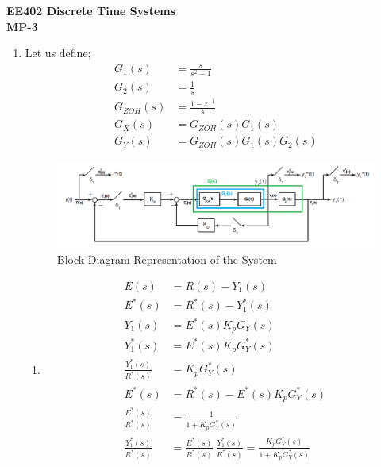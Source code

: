 \documentclass[a4paper,12pt]{article}
\begin{document}
\begin{center}
	\textbf{\large EE402 Discrete Time Systems \\[0.2cm] MP-3} \\
\end{center}


\begin{enumerate}
	\item Let us define;
	\begin{equation*}
		\begin{split}	
		 G_1(s) &=  \frac{s}{s^2-1} 	\\
		 G_2(s) &= \frac{1}{s} \\
		 G_{ZOH}(s) &= \frac{1-z^{-1}}{s} \\
		 G_X(s) &= G_{ZOH}(s) G_1(s)  \\[0.3cm] 
		 G_Y(s) &= G_{ZOH}(s)G_1(s) G_2(s)	
		\end{split}
	\end{equation*}
		
		
	
	
	\begin{figure}[H]
			\center
			\setlength{\unitlength}{\textwidth} 
		\includegraphics[width=1.0\unitlength]{images/q1o}
  		\caption{\label{fig:q1m}Block Diagram Representation of the System}
	\end{figure}
	
	\begin{enumerate}
		\item 
		
		\begin{equation*}
		\begin{split}		
		 E(s) &= R(s) - Y_1(s)  \\
		 E^*(s) &= R^*(s) - Y_1^*(s) \\[0.3cm]		 
		 Y_1(s) &= E^*(s) K_p G_Y(s)  \\
		 Y_1^*(s) &= E^*(s) K_p G_Y^*(s) \\[0.3cm]
		 \frac{Y_1^*(s)}{R^*(s)}&=K_pG_Y^*(s)\\[0.3cm]				 
		 E^*(s) &= R^*(s) - E^*(s) K_p G_Y^*(s) \\[0.3cm]
		 \frac{E^*(s)}{R^*(s)}&=\frac{1}{1+K_pG_Y^*(s)} \\[0.3cm]	  
		 \frac{Y_1^*(s)}{R^*(s)} &= \frac{E^*(s)}{R^*(s)} \ \frac{Y_1^*(s)}{E^*(s)} = \frac{K_p G_Y^*(s)}{1+K_pG_Y^*(s)} 
		\end{split}
		\end{equation*}
		


\end{enumerate}
\end{enumerate}
\end{document}

